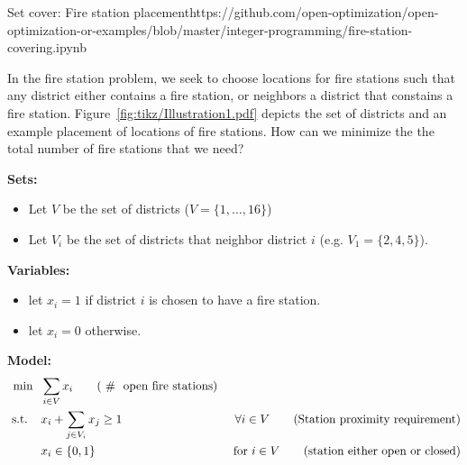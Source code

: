 \begin{examplewithcode}{Set cover: Fire station placement}{https://github.com/open-optimization/open-optimization-or-examples/blob/master/integer-programming/fire-station-covering.ipynb}
\label{example:fire-station}

In the fire station problem, we seek to choose locations for fire stations such that any district either contains a fire station, or neighbors a district that constains a fire station.  Figure~\ref{fig:tikz/Illustration1.pdf} depicts the set of districts and an example placement of locations of fire stations.  How can we minimize the the total number of fire stations that we need?


\noindent \textbf{Sets:}
\begin{itemize}
\item Let $V$ be the set of districts ($V = \{1, \dots, 16\}$)
\item Let $V_i$ be the set of districts that neighbor district $i$ (e.g. $V_1 = \{2,4,5\}$).
\end{itemize}

\noindent \textbf{Variables:}
\begin{itemize}
\item let $x_i = 1$ if district $i$ is chosen to have a fire station.
\item let $x_i = 0$ otherwise.
\end{itemize}
\textbf{Model:}
\begin{align}
\min  \  \ &\sum_{i \in V} x_i \tag{ \# \text{ open fire stations}}\\
\text{ s.t. }\ \ &  x_i + \sum_{j \in V_i} x_j \geq 1 & \forall{i \in V} \tag{Station proximity requirement}\\
& x_i \in \{0,1\} & \text{ for } i\in V  \tag{station either open or closed}
\end{align}
\end{examplewithcode}








